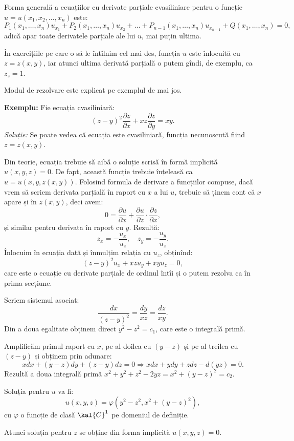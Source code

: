 \indent\indent Forma generală a ecuațiilor cu derivate parțiale cvasiliniare
pentru o funcție $ u = u(x_1, x_2, \dots, x_n) $ este:
\[
  P_1(x_1, \dots, x_n) u_{x_1} + P_2(x_1, \dots, x_n)u_{x_2} + \dots + %
  P_{n-1}(x_1, \dots, x_n) u_{x_{n-1}} + Q(x_1, \dots, x_n) = 0,
\]
adică apar toate derivatele parțiale ale lui $ u $, mai puțin ultima.

În exercițiile pe care o să le întîlnim cel mai des, funcția
$ u $ este înlocuită cu $ z = z(x, y) $, iar atunci ultima derivată
parțială o putem gîndi, de exemplu, ca $ z_z = 1 $.

Modul de rezolvare este explicat pe exemplul de mai jos.

\textbf{Exemplu:} Fie ecuația cvasiliniară:
\[
  (z - y)^2 \dfrac{\partial z}{\partial x} + xz \dfrac{\partial z}{\partial y} = xy.
\]
\emph{Soluție:} Se poate vedea că ecuația este cvasiliniară, funcția
necunoscută fiind $ z = z(x, y) $.

Din teorie, ecuația trebuie să aibă o soluție scrisă în formă implicită
$ u(x, y, z) = 0 $. De fapt, această funcție trebuie înțeleasă ca
$ u = u(x, y, z(x, y)) $. Folosind formula de derivare a funcțiilor compuse,
dacă vrem să scriem derivata parțială în raport cu $ x $ a lui $ u $, trebuie
să ținem cont că $ x $ apare și în $ z(x, y) $, deci avem:
\[
  0 = \dfrac{\partial u}{\partial x} + \dfrac{\partial u}{\partial z} \cdot %
  \dfrac{\partial z}{\partial x},
\]
și similar pentru derivata în raport cu $ y $. Rezultă:
\[
  z_x = -\dfrac{u_x}{u_z}, \quad z_y = -\dfrac{u_y}{u_z}.
\]
Înlocuim în ecuația dată și înmulțim relația cu $ u_z $, obținînd:
\[
  (z - y)^2 u_x + xz u_y + xy u_z = 0,
\]
care este o ecuație cu derivate parțiale de ordinul întîi și o putem rezolva
ca în prima secțiune.

Scriem sistemul asociat:
\[
  \dfrac{dx}{(z - y)^2} = \dfrac{dy}{xz} = \dfrac{dz}{xy}.
\]
Din a doua egalitate obținem direct $ y^2 - z^2 = c_1 $, care este o integrală primă.

Amplificăm primul raport cu $ x $, pe al doilea cu $ (y - z) $ și pe al treilea cu $ (z - y)$ 
și obținem prin adunare:
\[
  xdx + (y - z)dy + (z - y) dz = 0 \Rightarrow xdx + ydy + zdz - d(yz) = 0.
\]
Rezultă a doua integrală primă $ x^2 + y^2 + z^2 - 2yz = x^2 + (y - z)^2 = c_2 $.

Soluția pentru $ u $ va fi:
\[
  u(x, y, z) = \varphi(y^2 - z^2, x^2 + (y - z)^2),
\]
cu $ \varphi $ o funcție de clasă $ \kal{C}^1 $ pe domeniul de definiție.

Atunci soluția pentru $ z $ se obține din forma implicită $ u(x, y, z) = 0 $.


